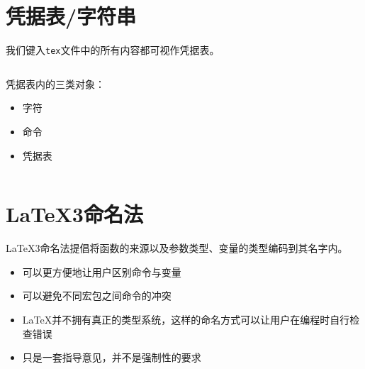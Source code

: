 \documentclass[aspectratio=169]{beamer}
\begin{document}
\section{凭据表/字符串}

\begin{frame}[fragile]

我们键入\texttt{tex}文件中的所有内容都可视作凭据表。

\vspace*{1em}

\begin{columns}

\begin{column}{0.3\linewidth}
凭据表内的三类对象：
\begin{itemize}
\item 字符
\item 命令
\item 凭据表
\end{itemize}
\end{column}


\end{columns}

\end{frame}

\section{\LaTeX3命名法}

\begin{frame}[fragile]

\LaTeX3命名法提倡将函数的来源以及参数类型、变量的类型编码到其名字内。

\begin{itemize}
\item 可以更方便地让用户区别命令与变量
\item 可以避免不同宏包之间命令的冲突
\item \LaTeX 并不拥有真正的类型系统，这样的命名方式可以让用户在编程时自行检查错误
\item 只是一套指导意见，并不是强制性的要求
\end{itemize}

\end{frame}
\end{document}
